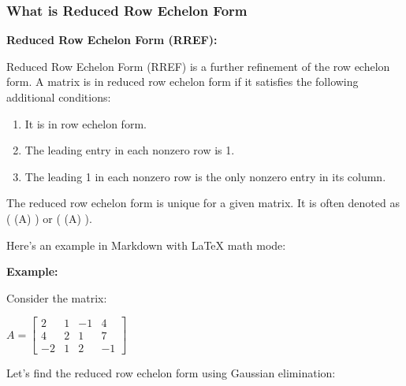 \documentclass[11pt]{article}
\providecommand{\tightlist}{%
      \setlength{\itemsep}{0pt}\setlength{\parskip}{0pt}}
\begin{document}
    \hypertarget{what-is-reduced-row-echelon-form}{%
\subsubsection{What is Reduced Row Echelon
Form}\label{what-is-reduced-row-echelon-form}}

    \textbf{Reduced Row Echelon Form (RREF):}

Reduced Row Echelon Form (RREF) is a further refinement of the row
echelon form. A matrix is in reduced row echelon form if it satisfies
the following additional conditions:

\begin{enumerate}
\def\labelenumi{\arabic{enumi}.}
\tightlist
\item
  It is in row echelon form.
\item
  The leading entry in each nonzero row is 1.
\item
  The leading 1 in each nonzero row is the only nonzero entry in its
  column.
\end{enumerate}

The reduced row echelon form is unique for a given matrix. It is often
denoted as ( (A) ) or ( (A) ).

Here's an example in Markdown with LaTeX math mode:

\textbf{Example:}

Consider the matrix:

$  A =\begin{bmatrix} 2 & 1 & -1 & 4 \\ 4 & 2 & 1 & 7 \\ -2 & 1 & 2 & -1 \end{bmatrix}$ 

Let's find the reduced row echelon form using Gaussian elimination:
\end{document}

